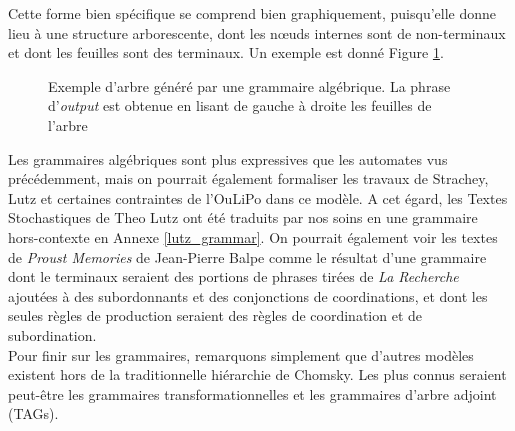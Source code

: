\documentclass{article}
\begin{document}
				\vspace{2mm}
				Cette forme bien spécifique se comprend bien graphiquement, puisqu'elle donne lieu à une structure arborescente, dont les nœuds internes sont de non-terminaux et dont les feuilles sont des terminaux. Un exemple est donné Figure \ref{fig:ex_syntactic_tree}.
				\begin{figure}[H]
					\centering
					\caption[]{Exemple d'arbre généré par une grammaire algébrique. La phrase d'\textit{output} est obtenue en lisant de gauche à droite les feuilles de l'arbre\footnotemark}
					\label{fig:ex_syntactic_tree}
				\end{figure}
				Les grammaires algébriques sont plus expressives que les automates vus précédemment, mais on pourrait également formaliser les travaux de Strachey, Lutz et certaines contraintes de l'OuLiPo dans ce modèle. A cet égard, les Textes Stochastiques de Theo Lutz ont été traduits par nos soins en une grammaire hors-contexte en Annexe \ref{lutz_grammar}. On pourrait également voir les textes de \textit{Proust Memories} de Jean-Pierre Balpe comme le résultat d'une grammaire dont le terminaux seraient des portions de phrases tirées de \textit{La Recherche} ajoutées à des subordonnants et des conjonctions de coordinations, et dont les seules règles de production seraient des règles de coordination et de subordination.\\
				
				Pour finir sur les grammaires, remarquons simplement que d'autres modèles existent hors de la traditionnelle hiérarchie de Chomsky. Les plus connus seraient peut-être les grammaires transformationnelles \autocite{chomsky1979} et les grammaires d'arbre adjoint (TAGs)\autocite{joshi1997}.
				
\end{document}
